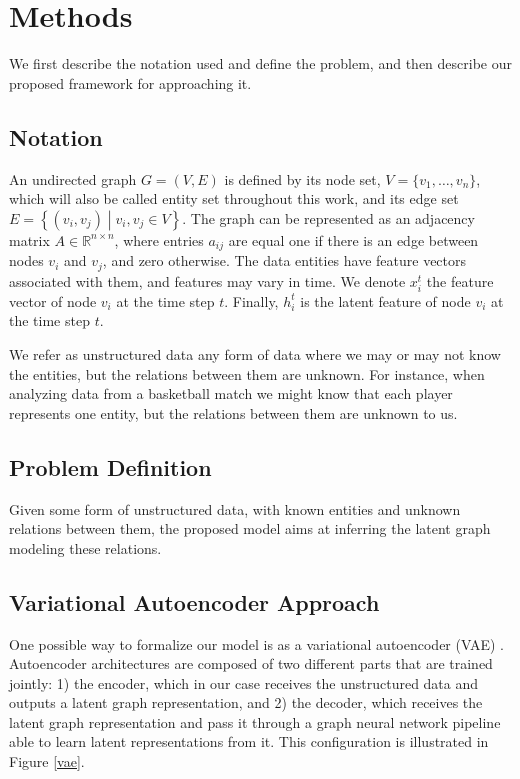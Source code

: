 \documentclass[12pt,a4paper]{article}
\begin{document}
	\section{Methods}
	\label{sec:Methods}

	We first describe the notation used and define the problem, and then describe our proposed framework for approaching it.

	\subsection{Notation}

	An undirected graph $G = (V,E)$ is defined by its node set, $V=\{v_1, \ldots, v_n \}$, which will also be called entity set throughout this work, and its edge set $E=\left\{(v_i, v_j)\middle|v_i, v_j \in V\right\}$. The graph can be represented as an adjacency matrix $A \in \mathbb{R}^{n \times n}$, where entries $a_{ij}$ are equal one if there is an edge between nodes $v_i$ and $v_j$, and zero otherwise. The data entities have feature vectors associated with them, and features may vary in time. We denote $x^t_i$ the feature vector of node $v_i$ at the time step $t$. Finally, $h^t_i$ is the latent feature of node $v_i$ at the time step $t$.

	We refer as unstructured data any form of data where we may or may not know the entities, but the relations between them are unknown. For instance, when analyzing data from a basketball match we might know that each player represents one entity, but the relations between them are unknown to us.

	\subsection{Problem Definition}

	Given some form of unstructured data, with known entities and unknown relations between them, the proposed model aims at inferring the latent graph modeling these relations.

	\subsection{Variational Autoencoder Approach}

	One possible way to formalize our model is as a variational autoencoder (VAE) \citep{KingmaandWelling2013, Rezende2014}. Autoencoder architectures are composed of two different parts that are trained jointly: 1) the encoder, which in our case receives the unstructured data and outputs a latent graph representation, and 2) the decoder, which receives the latent graph representation and pass it through a graph neural network pipeline able to learn latent representations from it. This configuration is illustrated in Figure \ref{vae}.
\end{document}
